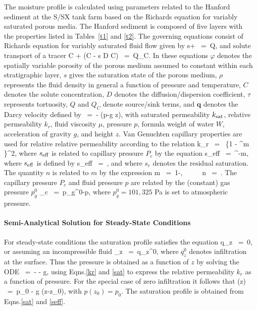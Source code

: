 \documentclass[12pt]{article}
\def\EQ#1\EN{\begin{equation}#1\end{equation}}
\newcommand{\eq}{\ =\ }
\newcommand{\p}{{\partial}}
\newcommand{\bnabla}{\boldsymbol{\nabla}}
\newcommand{\bq}{\boldsymbol{q}}
\begin{document}
The moisture profile is calculated using parameters related to the Hanford sediment at the S/SX tank farm based on the Richards equation for variably saturated porous media. The Hanford sediment is composed of five layers with the properties listed in Tables~\ref{t1} and \ref{t2}. The governing equations consist of Richards equation for variably saturated fluid flow given by
\EQ
\frac{\p}{\p t} \varphi s\rho + \bnabla\cdot\bq\rho \eq Q,
\EN
and solute transport of a tracer
\EQ
\frac{\p}{\p t}\varphi C + \bnabla\cdot\big(\bq C - \varphi s \tau D \bnabla C\big) \eq Q_C.
\EN
In these equations $\varphi$ denotes the spatially variable porosity of the porous medium assumed to constant within each stratigraphic layer, $s$ gives the saturation state of the porous medium, $\rho$ represents the fluid density in general a function of pressure and temperature, $C$ denotes the solute concentration, $D$ denotes the diffusion/dispersion coefficient, $\tau$ represents tortuosity, $Q$ and $Q_C$ denote source/sink terms, and $\bq$ denotes the Darcy velocity defined by
\EQ
\bq\eq -  \bnabla (p-\rho g z),
\EN
with saturated permeability $k_{\rm sat}$, relative permeability $k_r$, fluid viscosity $\mu$, pressure $p$, formula weight of water $W$, acceleration of gravity $g$, and height $z$. Van Genuchten capillary properties are used for relative relative permeability according to the relation
\EQ\label{kr}
k_{r} \eq {} \left\{1 - ^m \right\}^2, 
\EN
where $s_{\rm eff}$ is related to capillary pressure $P_c$ by the equation
\EQ\label{sat}
s_{\rm eff} \eq {}^{-m}, 
\EN 
where $s_{\rm 
eff}$ is defined by 
\EQ\label{seff}
s_{\rm eff} \eq {}, 
\EN 
and where $s_r$ denotes the residual saturation. The quantity $n$ is related to $m$ by the expression 
\EQ\label{lambda} 
m \eq 1-, \ \ \ \ \ n \eq {}. 
\EN 
The capillary pressure $P_c$ and fluid pressure $p$ are related by the (constant) gas pressure $p_g^0$
\EQ
P_c \eq p_g^0-p,
\EN
where $p_g^0 \!=\! 101,325$ Pa is set to atmospheric pressure.

\paragraph{Semi-Analytical Solution for Steady-State Conditions}

For steady-state conditions the saturation profile satisfies the equation
\EQ
\frac{d}{dz} \rho q_z \eq 0,
\EN
or assuming an incompressible fluid
\EQ
q_z \eq q_z^0,
\EN
where $q_z^0$ denotes infiltration at the surface. Thus the pressure is obtained as a function of $z$ by solving the ODE
\EQ\label{dpdz}
 \eq - - \rho g,
\EN
using Eqns.\eqref{kr} and \eqref{sat} to express the relative permeability $k_r$ as a function of pressure. For the special case of zero infiltration it follows that
\EQ
p(z) \eq p_0 - \rho g (z-z_0),
\EN
with $p(z_0)\!=\!p_0$. The saturation profile is obtained from Eqns.\eqref{sat} and \eqref{seff}.
\end{document}
